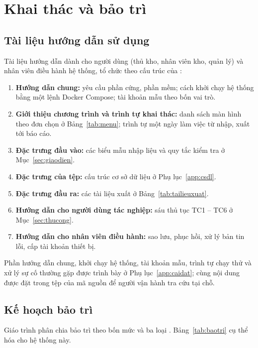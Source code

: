 \chapter{Khai thác và bảo trì}
\label{ch:khaithac}

\section{Tài liệu hướng dẫn sử dụng}
\label{sec:huongdan}

Tài liệu hướng dẫn dành cho người dùng (thủ kho, nhân viên kho, quản lý) và nhân viên điều hành hệ thống, tổ chức theo cấu trúc của \cite[Ch.~11]{tung_qlhttt}:
\begin{enumerate}
  \item \textbf{Hướng dẫn chung:} yêu cầu phần cứng, phần mềm; cách khởi chạy hệ thống bằng một lệnh Docker Compose; tài khoản mẫu theo bốn vai trò.
  \item \textbf{Giới thiệu chương trình và trình tự khai thác:} danh sách màn hình theo đơn chọn ở Bảng~\ref{tab:menu}; trình tự một ngày làm việc từ nhập, xuất tới báo cáo.
  \item \textbf{Đặc trưng đầu vào:} các biểu mẫu nhập liệu và quy tắc kiểm tra ở Mục~\ref{sec:giaodien}.
  \item \textbf{Đặc trưng của tệp:} cấu trúc cơ sở dữ liệu ở Phụ lục~\ref{app:csdl}.
  \item \textbf{Đặc trưng đầu ra:} các tài liệu xuất ở Bảng~\ref{tab:tailieuxuat}.
  \item \textbf{Hướng dẫn cho người dùng tác nghiệp:} sáu thủ tục TC1 -- TC6 ở Mục~\ref{sec:thucong}.
  \item \textbf{Hướng dẫn cho nhân viên điều hành:} sao lưu, phục hồi, xử lý bản tin lỗi, cấp tài khoản thiết bị.
\end{enumerate}
Phần hướng dẫn chung, khởi chạy hệ thống, tài khoản mẫu, trình tự chạy thử và xử lý sự cố thường gặp được trình bày ở Phụ lục~\ref{app:caidat}; cùng nội dung được đặt trong tệp  của mã nguồn để người vận hành tra cứu tại chỗ.

\section{Kế hoạch bảo trì}
\label{sec:baotri}

Giáo trình phân chia bảo trì theo bốn mức và ba loại \cite[Ch.~11]{tung_qlhttt}. Bảng~\ref{tab:baotri} cụ thể hóa cho hệ thống này.

